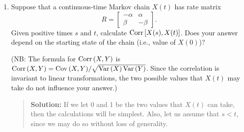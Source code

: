 \documentclass{article}
\def\Var{\mathop{\rm Var\,}\nolimits}
\def\Cov{\mathop{\rm Cov\,}\nolimits}
\def\Corr{\mathop{\rm Corr\,}\nolimits}
\begin{document}
\begin{enumerate}
\begin{enumerate}
    \end{enumerate}
    
  \item Suppose that a continuous-time Markov chain $X(t)$ has rate matrix
  \[
  R = \begin{bmatrix}
  -\alpha & \alpha \\
  \beta & -\beta
  \end{bmatrix}.  
  \]  
  Given positive times $s$ and $t$, calculate $\Corr[X(s), X(t)]$. Does your
  answer depend on the starting state of the chain (i.e., value of $X(0)$)?
  
  (NB: The formula for $\Corr(X,Y)$ is
  $\Corr(X,Y) = \Cov(X,Y)/\sqrt{\Var(X)\Var(Y)}$.
  Since the correlation is invariant to linear transformations, the two
  possible values that $X(t)$ may take do not influence your answer.)
  \begin{quotation}{\bf Solution:}
  If we let 0 and 1 be the two values that $X(t)$ can take, then the calculations will be 
  simplest.  Also, let us assume that $s<t$, since we may do so without loss of generality.
  

\end{quotation}
\end{enumerate}
\end{document}
